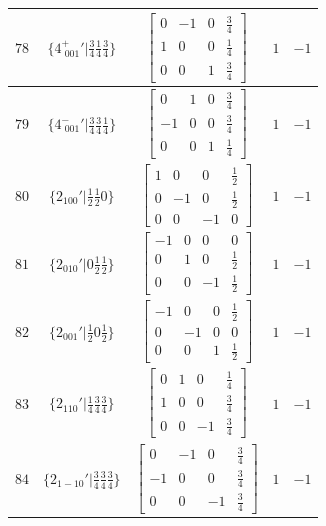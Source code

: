 \documentclass[fleqn,8pt]{jsarticle}
\begin{document}
\begin{longtable}{ccccc}
$ 78 $ & $ \{4^{+}_{\,\,001}{}'|\frac{3}{4} \frac{1}{4} \frac{3}{4}\} $ & $ \begin{bmatrix} 0 & -1 & 0 & \frac{3}{4} \\ 1 & 0 & 0 & \frac{1}{4} \\ 0 & 0 & 1 & \frac{3}{4} \end{bmatrix} $ & $ 1 $ & $ -1 $ \\ \hline
$ 79 $ & $ \{4^{-}_{\,\,001}{}'|\frac{3}{4} \frac{3}{4} \frac{1}{4}\} $ & $ \begin{bmatrix} 0 & 1 & 0 & \frac{3}{4} \\ -1 & 0 & 0 & \frac{3}{4} \\ 0 & 0 & 1 & \frac{1}{4} \end{bmatrix} $ & $ 1 $ & $ -1 $ \\ \hline
$ 80 $ & $ \{2{}_{100}{}'|\frac{1}{2} \frac{1}{2} 0\} $ & $ \begin{bmatrix} 1 & 0 & 0 & \frac{1}{2} \\ 0 & -1 & 0 & \frac{1}{2} \\ 0 & 0 & -1 & 0 \end{bmatrix} $ & $ 1 $ & $ -1 $ \\ \hline
$ 81 $ & $ \{2{}_{010}{}'|0 \frac{1}{2} \frac{1}{2}\} $ & $ \begin{bmatrix} -1 & 0 & 0 & 0 \\ 0 & 1 & 0 & \frac{1}{2} \\ 0 & 0 & -1 & \frac{1}{2} \end{bmatrix} $ & $ 1 $ & $ -1 $ \\ \hline
$ 82 $ & $ \{2{}_{001}{}'|\frac{1}{2} 0 \frac{1}{2}\} $ & $ \begin{bmatrix} -1 & 0 & 0 & \frac{1}{2} \\ 0 & -1 & 0 & 0 \\ 0 & 0 & 1 & \frac{1}{2} \end{bmatrix} $ & $ 1 $ & $ -1 $ \\ \hline
$ 83 $ & $ \{2{}_{110}{}'|\frac{1}{4} \frac{3}{4} \frac{3}{4}\} $ & $ \begin{bmatrix} 0 & 1 & 0 & \frac{1}{4} \\ 1 & 0 & 0 & \frac{3}{4} \\ 0 & 0 & -1 & \frac{3}{4} \end{bmatrix} $ & $ 1 $ & $ -1 $ \\ \hline
$ 84 $ & $ \{2{}_{1-10}{}'|\frac{3}{4} \frac{3}{4} \frac{3}{4}\} $ & $ \begin{bmatrix} 0 & -1 & 0 & \frac{3}{4} \\ -1 & 0 & 0 & \frac{3}{4} \\ 0 & 0 & -1 & \frac{3}{4} \end{bmatrix} $ & $ 1 $ & $ -1 $ \\ \hline

\end{longtable}
\end{document}

